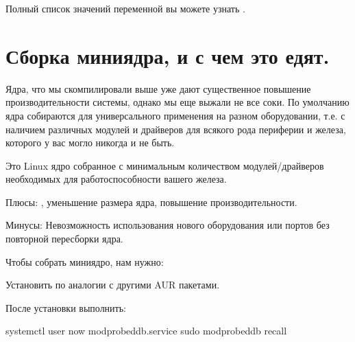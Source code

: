 \documentclass[letterpaper,10pt,russian,openany]{sphinxmanual}
\begin{document}
\sphinxAtStartPar
Полный список значений переменной вы можете узнать \sphinxhyphen{} .

\sphinxstepscope

\ignorespaces 

\chapter{Сборка мини\sphinxhyphen{}ядра, и с чем это едят.}
\label{\detokenize{source/mini-kernel:mini-kernel}}\label{\detokenize{source/mini-kernel:index-0}}\label{\detokenize{source/mini-kernel:id1}}\label{\detokenize{source/mini-kernel::doc}}
\sphinxAtStartPar
Ядра, что мы скомпилировали выше уже дают существенное повышение производительности системы, однако мы еще выжали не все соки.
По умолчанию ядра собираются для универсального применения на разном оборудовании,
т.е. с наличием различных модулей и драйверов для всякого рода периферии и железа, которого у вас могло никогда и не быть.

\sphinxAtStartPar
{} \sphinxhyphen{} Это Linux ядро собранное с минимальным количеством модулей/драйверов необходимых для работоспособности вашего железа.

\sphinxAtStartPar
Плюсы: ,
уменьшение размера ядра, повышение производительности.

\sphinxAtStartPar
Минусы: Невозможность использования нового оборудования или портов без повторной пересборки ядра.

\sphinxAtStartPar
Чтобы собрать мини\sphinxhyphen{}ядро, нам нужно:

\sphinxAtStartPar
Установить  по аналогии с другими AUR пакетами.

\sphinxAtStartPar
После установки выполнить:

\begin{sphinxVerbatim}[commandchars=\\\{\}]
systemctl \PYGZhy{}\PYGZhy{}user  \PYGZhy{}\PYGZhy{}now modprobed\PYGZhy{}db.service 
sudo modprobed\PYGZhy{}db recall 
\end{sphinxVerbatim}
\end{document}
